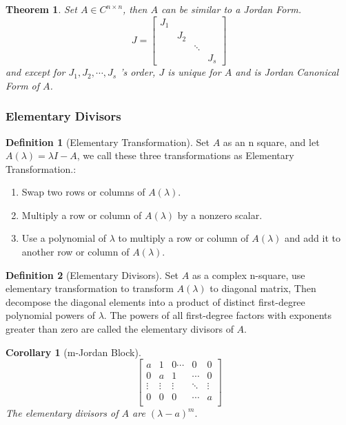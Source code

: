 \documentclass{article}
\newtheorem{theorem}{Theorem}[section]
\newtheorem{corollary}{Corollary}[theorem]
\theoremstyle{definition}
\newtheorem{defi}{Definition}[section]
\begin{document}
\begin{theorem}
    Set $A\in C^{n\times n}$, then $A$ can be similar to a Jordan Form.
    \[
    J=\begin{bmatrix}
        J_1 & & \\
        & J_2 & \\
        & & \ddots \\
        & & & J_s
    \end{bmatrix}
    \]
    and except for $J_1,J_2,\cdots,J_s$ 's order, $J$ is unique for $A$ and is Jordan Canonical Form of $A$.
\end{theorem}

\subsubsection{Elementary Divisors}
\begin{defi}[Elementary Transformation]
    Set $A$ as an n square, and let $A(\lambda)=\lambda I-A$, we call these three transformations as Elementary Transformation.:
    \begin{enumerate}
        \item Swap two rows or columns of $A(\lambda)$.
        \item Multiply a row or column of $A(\lambda)$ by a nonzero scalar.
        \item Use a polynomial of $\lambda$ to multiply a row or column of $A(\lambda)$ and add it to another row or column of $A(\lambda)$.
    \end{enumerate}
\end{defi}

\begin{defi}[Elementary Divisors]
    Set $A$ as a complex n-square, use elementary transformation to transform $A(\lambda)$ to diagonal matrix, Then decompose the diagonal elements into a product of distinct first-degree polynomial powers of 
    $\lambda$. The powers of all first-degree factors with exponents greater than zero are called the elementary divisors of $A$. 
\end{defi}

\begin{corollary}[m-Jordan Block]
    $$\begin{bmatrix}
        a&1&0\cdots&0&0\\
        0&a&1&\cdots&0\\
        \vdots&\vdots&\vdots&\ddots&\vdots\\
        0&0&0&\cdots&a\\
    \end{bmatrix}$$ 
    The elementary divisors of $A$ are $(\lambda-a)^m.$
\end{corollary}
\end{document}
